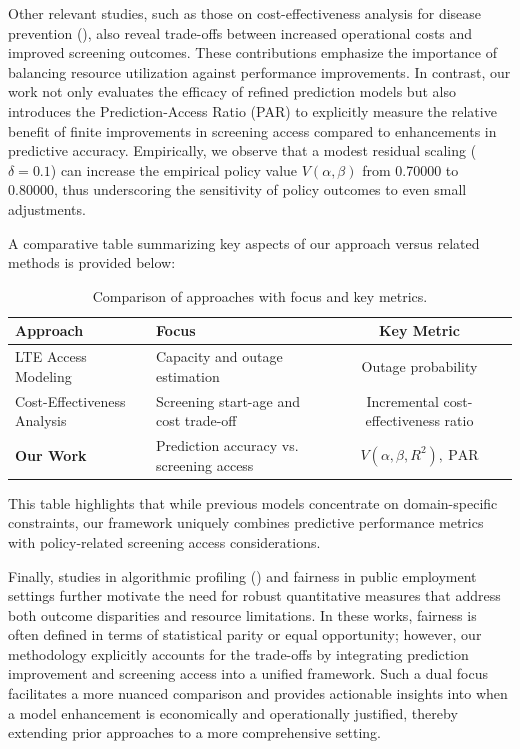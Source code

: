 \documentclass{article} %
\begin{document}
Other relevant studies, such as those on cost-effectiveness analysis for disease prevention (\cite{xiong2024costeffectiveness}), also reveal trade-offs between increased operational costs and improved screening outcomes. These contributions emphasize the importance of balancing resource utilization against performance improvements. In contrast, our work not only evaluates the efficacy of refined prediction models but also introduces the Prediction-Access Ratio (PAR) to explicitly measure the relative benefit of finite improvements in screening access compared to enhancements in predictive accuracy. Empirically, we observe that a modest residual scaling (\(\delta=0.1\)) can increase the empirical policy value \( V(\alpha,\beta) \) from 0.70000 to 0.80000, thus underscoring the sensitivity of policy outcomes to even small adjustments.

A comparative table summarizing key aspects of our approach versus related methods is provided below:
\begin{table}[h]
\centering
\begin{tabularx}{\textwidth}{|X|X|c|}
\hline
\textbf{Approach} & \textbf{Focus} & \textbf{Key Metric} \\
\hline
LTE Access Modeling & Capacity and outage estimation & Outage probability \\
Cost-Effectiveness Analysis & Screening start-age and cost trade-off & Incremental cost-effectiveness ratio \\
\textbf{Our Work} & Prediction accuracy vs. screening access & \(V(\alpha,\beta,R^2), \ \text{PAR}\) \\
\hline
\end{tabularx}
\caption{Comparison of approaches with focus and key metrics.}
\label{tab:approach_comparison}
\end{table}
This table highlights that while previous models concentrate on domain-specific constraints, our framework uniquely combines predictive performance metrics with policy-related screening access considerations.

Finally, studies in algorithmic profiling (\cite{kern2021fairness}) and fairness in public employment settings further motivate the need for robust quantitative measures that address both outcome disparities and resource limitations. In these works, fairness is often defined in terms of statistical parity or equal opportunity; however, our methodology explicitly accounts for the trade-offs by integrating prediction improvement and screening access into a unified framework. Such a dual focus facilitates a more nuanced comparison and provides actionable insights into when a model enhancement is economically and operationally justified, thereby extending prior approaches to a more comprehensive setting.
\end{document}
